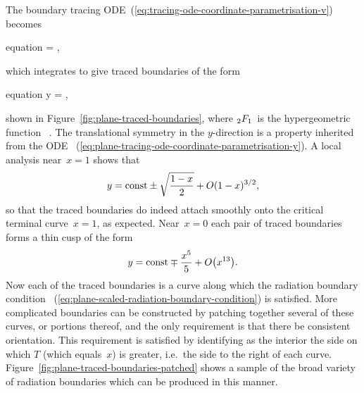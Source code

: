 The boundary tracing ODE~(\ref{eq:tracing-ode-coordinate-parametrisation-v})
becomes
\begin{important}{equation}
   = \mp {},
  \label{eq:plane-tracing-ode-coordinate-parametrisation-y}
\end{important}
which integrates to give traced boundaries of the form
\begin{important}{equation}
  y =
  \const
    \mp
  \hypergeo {},
  \label{eq:plane-traced-boundary}
\end{important}
shown in Figure~\ref{fig:plane-traced-boundaries},
where $\mathop{}\!{_2F_1}$~is the hypergeometric function~%
\cite[Chapter~15]{olver-2010-nist-handbook-mathematical-functions}.
The translational symmetry in the $y$-direction
is a property inherited from the ODE~%
  (\ref{eq:plane-tracing-ode-coordinate-parametrisation-y}).
A local analysis near~$x = 1$ shows that
\begin{equation}
  y = \mathrm{const} \pm \sqrt{\frac{1 - x}{2}} + \mathop{}\! O (1 - x)^{3/2},
  \label{eq:plane-traced-boundary-x-near-1}
\end{equation}
so that the traced boundaries do indeed attach smoothly
onto the critical terminal curve~$x = 1$, as expected.
Near~$x = 0$ each pair of traced boundaries forms a thin cusp of the form
\begin{equation}
  y = \const \mp \frac{x^5}{5} + \order \roundbr*{x^{13}}.
  \label{eq:plane-traced-boundary-x-near-0}
\end{equation}
Now each of the traced boundaries is a curve along which
the radiation boundary condition~%
  (\ref{eq:plane-scaled-radiation-boundary-condition})
is satisfied.
More complicated boundaries can be constructed
by patching together several of these curves, or portions thereof,
and the only requirement is that there be consistent orientation.
This requirement is satisfied by identifying as the interior
the side on which $T$ (which equals~$x$) is greater,
i.e.~the side to the right of each curve.
Figure~\ref{fig:plane-traced-boundaries-patched} shows
a sample of the broad variety of radiation boundaries
which can be produced in this manner.

\begin{figure}
\end{figure}

